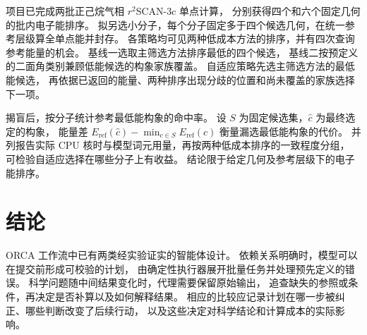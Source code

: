 \documentclass[UTF8,a4paper,11pt,fontset=fandol]{ctexart}
\begin{document}
项目已完成两批正己烷气相 $r^2$SCAN-3c 单点计算，
分别获得四个和六个固定几何的批内电子能排序\cite{projectarchive}。
拟另选小分子，每个分子固定多于四个候选几何，在统一参考层级算全单点能并封存。
各策略均可见两种低成本方法的排序，并有四次查询参考能量的机会。
基线一选取主筛选方法排序最低的四个候选，
基线二按预定义的二面角类别兼顾低能候选的构象家族覆盖。
自适应策略先选主筛选方法的最低能候选，
再依据已返回的能量、两种排序出现分歧的位置和尚未覆盖的家族选择下一项。

揭盲后，按分子统计参考最低能构象的命中率。
设 $S$ 为固定候选集，$\hat c$ 为最终选定的构象，
能量差 $E_{\mathrm{ref}}(\hat c)-\min_{c\in S}E_{\mathrm{ref}}(c)$ 衡量漏选最低能构象的代价。
并列报告实际 CPU 核时与模型词元用量，再按两种低成本排序的一致程度分组，
可检验自适应选择在哪些分子上有收益。
结论限于给定几何及参考层级下的电子能排序。

\section{结论}
ORCA 工作流中已有两类经实验证实的智能体设计。
依赖关系明确时，模型可以在提交前形成可校验的计划，
由确定性执行器展开批量任务并处理预先定义的错误。
科学问题随中间结果变化时，代理需要保留原始输出，
追查缺失的参照或条件，再决定是否补算以及如何解释结果。
相应的比较应记录计划在哪一步被纠正、哪些判断改变了后续行动，
以及这些决定对科学结论和计算成本的实际影响\cite{qplanner,agente,quntur}。
\end{document}
